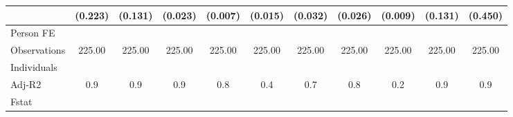 {\begin{tabular}{l*{10}{c}}
                    &(0.223)   &(0.131)   &(0.023)   &(0.007)   &(0.015)   &(0.032)   &(0.026)   &(0.009)   &(0.131)   &(0.450)   \\
\hline
Person FE           &         &         &         &         &         &         &         &         &         &         \\
Observations        &225.00   &225.00   &225.00   &225.00   &225.00   &225.00   &225.00   &225.00   &225.00   &225.00   \\
Individuals         &         &         &         &         &         &         &         &         &         &         \\
Adj-R2              &   0.9   &   0.9   &   0.9   &   0.8   &   0.4   &   0.7   &   0.8   &   0.2   &   0.9   &   0.9   \\
Fstat               &         &         &         &         &         &         &         &         &         &         \\
\hline\hline
\end{tabular}
}
